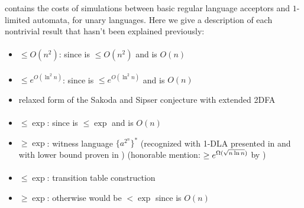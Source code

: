  contains the costs of simulations between basic regular language acceptors and $1$-limited automata, for unary languages.
Here we give a description of each nontrivial result that hasn't been explained previously:

\paragraph{\ONFA{}\tto\ODLA}\label{cost:1NFAto1DLAu}
\begin{itemize}
	\item $\le O(n^2)$: since \hyperref[cost:1NFAto2DFAu]{\ONFA{}\tto\TDFA} is $\le O(n^2)$ and \TDFA{}\tto\ODLA is $O(n)$
\end{itemize}
\paragraph{\TNFA{}\tto\ODLA}
\begin{itemize}
	\item $\le e^{O(\ln^2n)}$: since \hyperref[cost:2NFAto2DFAu]{\TNFA{}\tto\TDFA} is $\le e^{O(\ln^2n)}$ and \TDFA{}\tto\ODLA is $O(n)$
	\item relaxed form of the Sakoda and Sipser conjecture with extended 2DFA
\end{itemize}
\paragraph{\ODLA{}\tto\TNFA}\label{cost:1DLAto2NFAu}
\begin{itemize}
	\item $\le\exp$: since \hyperref[cost:1DLAto1DFAu]{\ODLA{}\tto\ODFA} is $\le\exp$ and \ODFA{}\tto\TNFA is $O(n)$
	\item $\ge\exp$: witness language $\{a^{2^n}\}^*$ (recognized with 1-DLA presented in \cite{PigPri19} and with \TNFA lower bound proven in \cite{MerPig00}) (honorable mention: $\ge e^{\Omega(\sqrt{n\ln n})}$ by \cite{KutPig+18})
\end{itemize}
\paragraph{\ODLA{}\tto\ODFA}\label{cost:1DLAto1DFAu}
\begin{itemize}
	\item $\le\exp$: transition table construction \cite{PigPis14}
	\item $\ge\exp$: otherwise \hyperref[cost:1DLAto2NFAu]{\ODLA{}\tto\TNFA} would be $<\exp$ since \ODFA{}\tto\TNFA is $O(n)$
\end{itemize}
